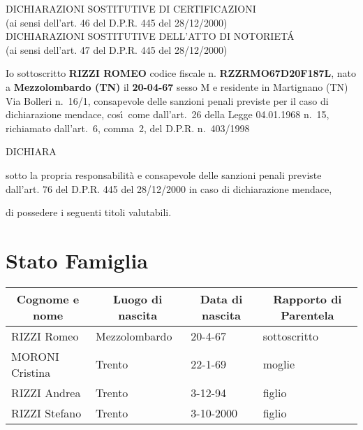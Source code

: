 \documentclass[11pt]{article}
\begin{document}
\begin{center}
   DICHIARAZIONI SOSTITUTIVE DI CERTIFICAZIONI \\
   (ai sensi dell'art. 46 del D.P.R. 445 del  28/12/2000) \\

\vspace{3mm}
   DICHIARAZIONI SOSTITUTIVE DELL'ATTO DI NOTORIET\'A \\
   (ai sensi dell'art. 47 del D.P.R. 445 del  28/12/2000)
\end{center}
 
\bigskip
                                  
\noindent
Io sottoscritto {\bf RIZZI ROMEO} codice fiscale n. {\bf RZZRMO67D20F187L},
nato a {\bf Mezzolombardo (TN)} il {\bf 20-04-67} sesso M
e residente in Martignano (TN) Via Bolleri n.~16/1,
consapevole 
delle sanzioni penali previste per il caso di dichiarazione 
mendace, cos\'\i\  come dall'art.~26 della Legge 04.01.1968 n.~15,
richiamato dall'art.~6, comma~2, del D.P.R. n.~403/1998

\begin{center}
 DICHIARA
\end{center}
sotto la propria responsabilità e consapevole delle sanzioni penali previste dall’art. 76 del D.P.R. 445 del  28/12/2000  in caso di dichiarazione mendace,

di possedere i seguenti titoli valutabili.\\


\section{Stato Famiglia}

\begin{center}
\begin{tabular}[c]{||l|l|l|l||}
 \hline \hline
    \multicolumn{1}{||c}{Cognome e nome} &
    \multicolumn{1}{|c}{Luogo di nascita} &
    \multicolumn{1}{|c}{Data di nascita} &
    \multicolumn{1}{|c||}{Rapporto di Parentela} \\
 \hline \hline
    RIZZI Romeo & Mezzolombardo & 20-4-67 & sottoscritto \\
 \hline
    MORONI Cristina & Trento & 22-1-69 & moglie \\
 \hline
    RIZZI Andrea & Trento & 3-12-94 & figlio \\
 \hline
    RIZZI Stefano & Trento & 3-10-2000 & figlio \\
 \hline \hline
\end{tabular}
\end{center}
\end{document}
